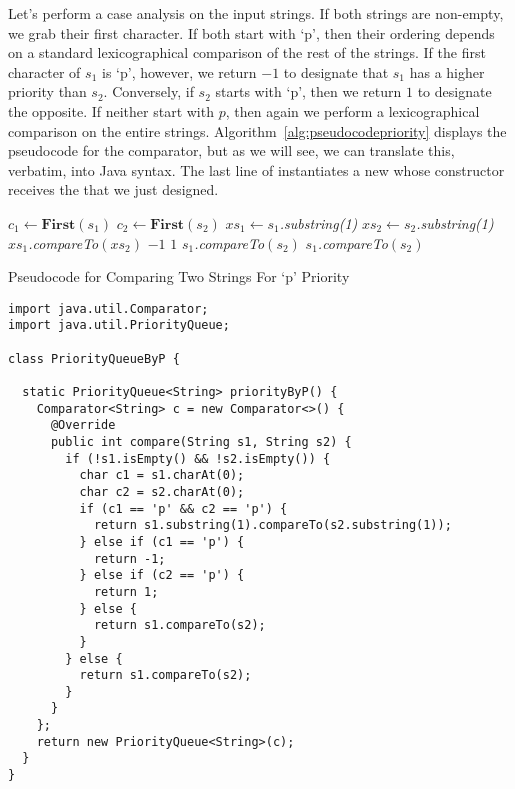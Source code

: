 Let's perform a case analysis on the input strings. If both strings are non-empty, we grab their first character. If both start with `p', then their ordering depends on a standard lexicographical comparison of the rest of the strings. If the first character of $s_1$ is `p', however, we return $-1$ to designate that $s_1$ has a higher priority than $s_2$. Conversely, if $s_2$ starts with `p', then we return $1$ to designate the opposite. If neither start with $p$, then again we perform a lexicographical comparison on the entire strings. Algorithm~\ref{alg:pseudocodepriority} displays the pseudocode for the comparator, but as we will see, we can translate this, verbatim, into Java syntax. The last line of  instantiates a new  whose constructor receives the  that we just designed. 
\begin{algorithm}[H]
\begin{algorithmic}
        \State $c_1 \gets \textbf{First}(s_1)$
        \State $c_2 \gets \textbf{First}(s_2)$
            \State $xs_1 \gets s_1$\emph{.substring(1)}
            \State $xs_2 \gets s_2$\emph{.substring(1)}
            \State \Return $xs_1$\emph{.compareTo}$(xs_2)$
            \State \Return $-1$
            \State \Return $1$
        \Else
            \State \Return $s_1$\emph{.compareTo}$(s_2)$
        \EndIf
    \Else
        \State \Return $s_1$\emph{.compareTo}$(s_2)$
    \EndIf
\EndProcedure
\end{algorithmic}
\caption{Pseudocode for Comparing Two Strings For `p' Priority}
\label{alg:pseudocodepriority}
\end{algorithm}

\begin{lstlisting}[language=MyJava]
import java.util.Comparator;
import java.util.PriorityQueue;

class PriorityQueueByP {

  static PriorityQueue<String> priorityByP() {
    Comparator<String> c = new Comparator<>() {
      @Override
      public int compare(String s1, String s2) {
        if (!s1.isEmpty() && !s2.isEmpty()) {
          char c1 = s1.charAt(0);
          char c2 = s2.charAt(0);
          if (c1 == 'p' && c2 == 'p') {
            return s1.substring(1).compareTo(s2.substring(1));
          } else if (c1 == 'p') {
            return -1;
          } else if (c2 == 'p') {
            return 1;
          } else {
            return s1.compareTo(s2);
          }
        } else {
          return s1.compareTo(s2);
        }
      }
    };
    return new PriorityQueue<String>(c);
  }
}
\end{lstlisting}

